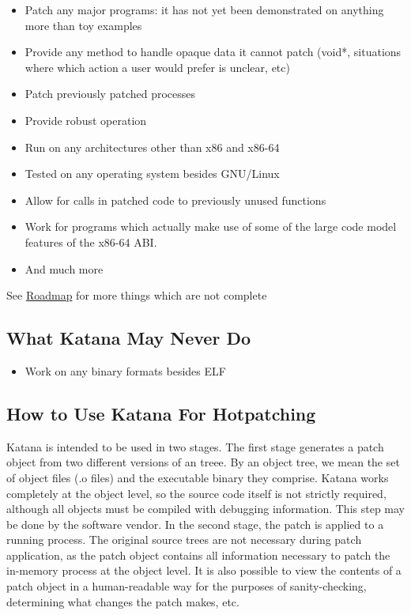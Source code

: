 \documentclass[11pt]{article}
\begin{document}
\begin{itemize}
\item Patch any major programs: it has not yet been demonstrated on
     anything more than toy examples
\item Provide any method to handle opaque data it cannot patch (void*,
     situations where which action a user would prefer is unclear, etc)
\item Patch previously patched processes
\item Provide robust operation
\item Run on any architectures other than x86 and x86-64
\item Tested on any operating system besides GNU/Linux
\item Allow for calls in patched code to previously unused functions
\item Work for programs which actually make use of some of the large
     code model features of the x86-64 ABI.
\item And much more
\end{itemize}
   See \hyperref[sec-3.14]{Roadmap} for more things which are not complete

\subsection{What Katana May Never Do}
\label{sec-3.4}

\begin{itemize}
\item Work on any binary formats besides ELF
\end{itemize}
\subsection{How to Use Katana For Hotpatching}
\label{sec-3.5}

   Katana is intended to be used in two stages. The first stage
   generates a patch object from two different versions of an
   treee. By an object tree, we mean the set of object files (.o files)
   and the executable binary they comprise. Katana works completely at
   the object level, so the source code itself is not strictly
   required, although all objects must be compiled with debugging
   information. This step may be done by the software vendor. In the
   second stage, the patch is applied to a running process. The
   original source trees are not necessary during patch application, as
   the patch object contains all information necessary to patch the
   in-memory process at the object level. It is also possible to view
   the contents of a patch object in a human-readable way for the
   purposes of sanity-checking, determining what changes the patch
   makes, etc.
\end{document}
